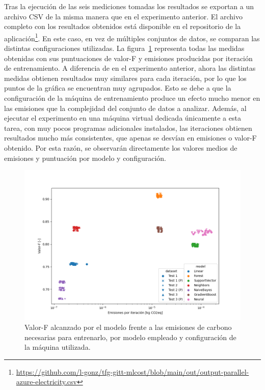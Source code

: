 Tras la ejecución de las seis mediciones tomadas los resultados se exportan a un archivo CSV de la misma manera que en el experimento anterior. El archivo completo con los resultados obtenidos está disponible en el repositorio de la aplicación\footnote{\url{https://github.com/l-gonz/tfg-gitt-mlcost/blob/main/out/output-parallel-azure-electricity.csv}}. En este caso, en vez de múltiples conjuntos de datos, se comparan las distintas configuraciones utilizadas. La figura~\ref{fig:4-2-non-average-scatter} representa todas las medidas obtenidas con sus puntuaciones de valor-F y emisiones producidas por iteración de entrenamiento. A diferencia de en el experimento anterior, ahora las distintas medidas obtienen resultados muy similares para cada iteración, por lo que los puntos de la gráfica se encuentran muy agrupados. Esto se debe a que la configuración de la máquina de entrenamiento produce un efecto mucho menor en las emisiones que la complejidad del conjunto de datos a analizar. Además, al ejecutar el experimento en una máquina virtual dedicada únicamente a esta tarea, con muy pocos programas adicionales instalados, las iteraciones obtienen resultados mucho más consistentes, que apenas se desvían en emisiones o valor-F obtenido. Por esta razón, se observarán directamente los valores medios de emisiones y puntuación por modelo y configuración.

\begin{figure}[H]
  \centerline{
     \includegraphics[width=1.2\textwidth, keepaspectratio]{img/graph/4-2-scatter-fitem-fscore.png}
  }
  \caption{Valor-F alcanzado por el modelo frente a las emisiones de carbono necesarias para entrenarlo, por modelo empleado y configuración de la máquina utilizada.}
  \label{fig:4-2-non-average-scatter}
\end{figure}

